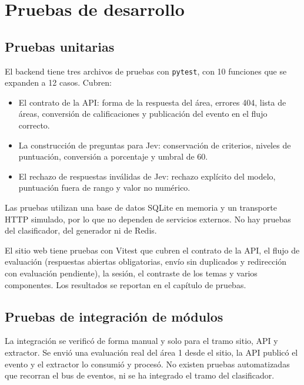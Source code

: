 \section{Pruebas de desarrollo}

\subsection{Pruebas unitarias}
El backend tiene tres archivos de pruebas con \texttt{pytest}, con 10 funciones que se expanden a 12 casos. Cubren:
\begin{itemize}
    \item El contrato de la API: forma de la respuesta del área, errores 404, lista de áreas, conversión de calificaciones y publicación del evento en el flujo correcto.
    \item La construcción de preguntas para Jev: conservación de criterios, niveles de puntuación, conversión a porcentaje y umbral de 60.
    \item El rechazo de respuestas inválidas de Jev: rechazo explícito del modelo, puntuación fuera de rango y valor no numérico.
\end{itemize}
Las pruebas utilizan una base de datos SQLite en memoria y un transporte HTTP simulado, por lo que no dependen de servicios externos. No hay pruebas del clasificador, del generador ni de Redis.

El sitio web tiene pruebas con Vitest que cubren el contrato de la API, el flujo de evaluación (respuestas abiertas obligatorias, envío sin duplicados y redirección con evaluación pendiente), la sesión, el contraste de los temas y varios componentes. Los resultados se reportan en el capítulo de pruebas.

\subsection{Pruebas de integración de módulos}
La integración se verificó de forma manual y solo para el tramo sitio, API y extractor. Se envió una evaluación real del área 1 desde el sitio, la API publicó el evento y el extractor lo consumió y procesó. No existen pruebas automatizadas que recorran el bus de eventos, ni se ha integrado el tramo del clasificador.

\endinput


